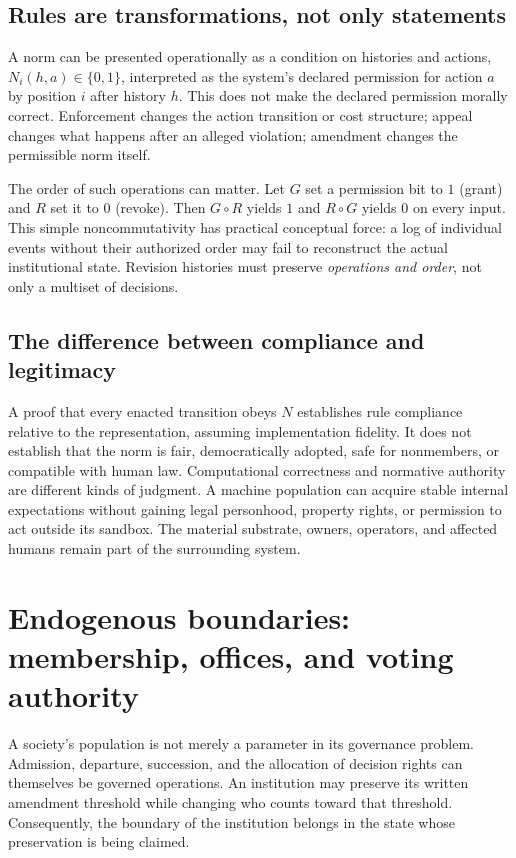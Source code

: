 \documentclass[11pt,letterpaper]{article}
\theoremstyle{plain}
\theoremstyle{definition}
\theoremstyle{remark}
\begin{document}
\subsection{Rules are transformations, not only statements}

A norm can be presented operationally as a condition on histories and actions, $N_i(h,a)\in\{0,1\}$, interpreted as the system's declared permission for action $a$ by position $i$ after history $h$. This does not make the declared permission morally correct. Enforcement changes the action transition or cost structure; appeal changes what happens after an alleged violation; amendment changes the permissible norm itself.

The order of such operations can matter. Let $G$ set a permission bit to $1$ (grant) and $R$ set it to $0$ (revoke). Then $G\circ R$ yields $1$ and $R\circ G$ yields $0$ on every input. This simple noncommutativity has practical conceptual force: a log of individual events without their authorized order may fail to reconstruct the actual institutional state. Revision histories must preserve \emph{operations and order}, not only a multiset of decisions.

\subsection{The difference between compliance and legitimacy}

A proof that every enacted transition obeys $N$ establishes rule compliance relative to the representation, assuming implementation fidelity. It does not establish that the norm is fair, democratically adopted, safe for nonmembers, or compatible with human law. Computational correctness and normative authority are different kinds of judgment. A machine population can acquire stable internal expectations without gaining legal personhood, property rights, or permission to act outside its sandbox. The material substrate, owners, operators, and affected humans remain part of the surrounding system.


\section{Endogenous boundaries: membership, offices, and voting authority}\label{sec:membership}
A society's population is not merely a parameter in its governance problem. Admission, departure, succession, and the allocation of decision rights can themselves be governed operations. An institution may preserve its written amendment threshold while changing who counts toward that threshold. Consequently, the boundary of the institution belongs in the state whose preservation is being claimed.
\end{document}
